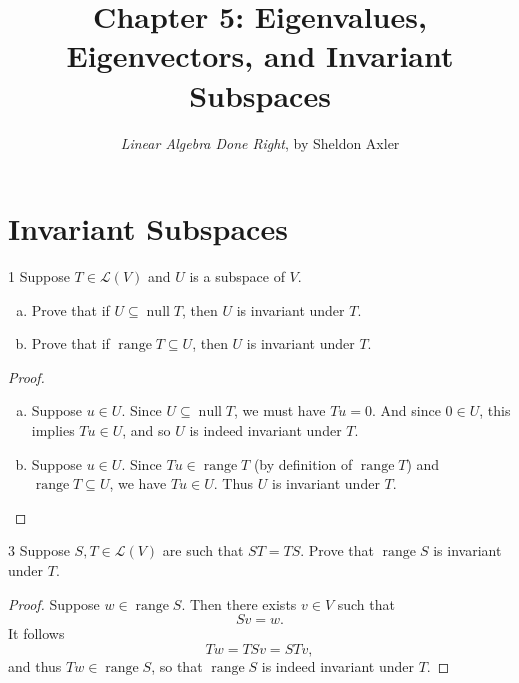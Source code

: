 \documentclass{extarticle}
\title{\vspace{-2em}Chapter 5: Eigenvalues, Eigenvectors, and Invariant Subspaces}
\author{\emph{Linear Algebra Done Right}, by Sheldon Axler}
\date{}
\newenvironment{problem}[1]{\begin{prob*}{#1}{}}{\end{prob*}}
\newcommand{\Hom}{\mathcal{L}}
\DeclareMathOperator{\Null}{null}
\DeclareMathOperator{\Range}{range}
\begin{document}
\maketitle



\section{Invariant Subspaces}

\begin{problem}{1}
Suppose $T\in\Hom(V)$ and $U$ is a subspace of $V$.
\begin{enumerate}[(a)]
\item Prove that if $U\subseteq \Null T$, then $U$ is invariant under $T$.
\item Prove that if $\Range T\subseteq U$, then $U$ is invariant under $T$.
\end{enumerate}
\end{problem}
\begin{proof}
\begin{enumerate}[(a)]
\item Suppose $u\in U$.  Since $U\subseteq\Null T$, we must have $Tu = 0$. And since $0\in U$, this implies $Tu\in U$, and so $U$ is indeed invariant under $T$.
\item Suppose $u\in U$.  Since $Tu\in \Range T$ (by definition of $\Range T$) and $\Range T\subseteq U$, we have $Tu\in U$.  Thus $U$ is invariant under $T$.  \qedhere
\end{enumerate}
\end{proof}

\begin{problem}{3}
Suppose $S,T\in\Hom(V)$ are such that $ST = TS$.  Prove that $\Range S$ is invariant under $T$.
\end{problem}
\begin{proof}
Suppose $w\in\Range S$.  Then there exists $v\in V$ such that
\begin{equation*}
Sv = w.
\end{equation*}
It follows
\begin{equation*}
Tw = TSv = STv,
\end{equation*}
and thus $Tw\in \Range S$, so that $\Range S$ is indeed invariant under $T$.
\end{proof}
\end{document}
